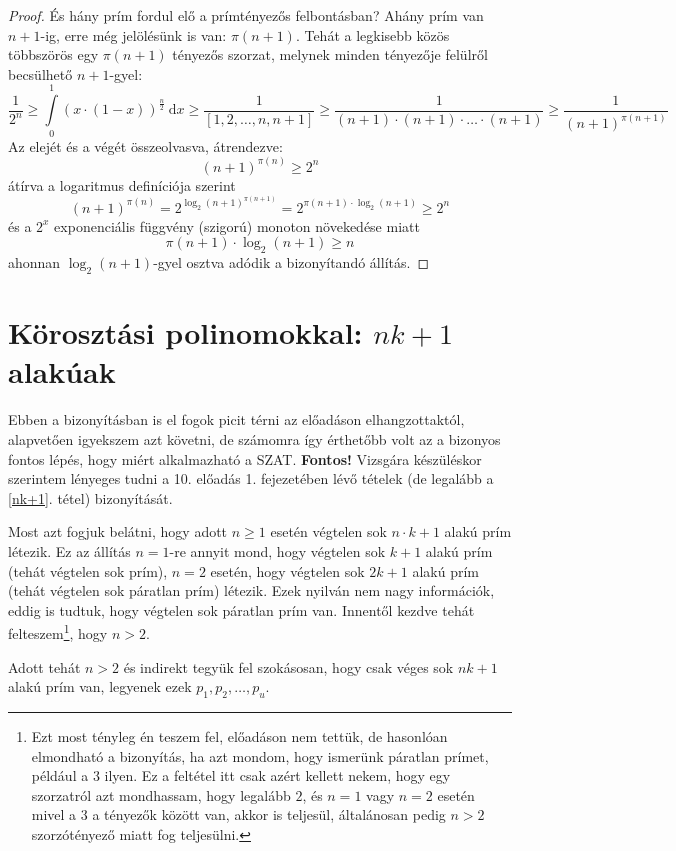 \documentclass[12pt]{book}
\theoremstyle{plain} %
\theoremstyle{definition} %
\theoremstyle{remark}
\numberwithin{equation}{section}  %
\begin{document}
\begin{proof}
		És hány prím fordul elő a prímtényezős felbontásban? Ahány prím van $n+1$-ig, erre még jelölésünk is van: $\pi(n+1)$. Tehát a legkisebb közös többszörös egy $\pi(n+1)$ tényezős szorzat, melynek minden tényezője felülről becsülhető $n+1$-gyel:
		\[ \dfrac{1}{2^n} \geq \int\limits_{0}^{1} (x\cdot (1-x))^\frac{n}{2}\ \mathrm{d}x \geq  \dfrac{1}{[1,2,\ldots, n, n+1]} \geq \dfrac{1}{(n+1) \cdot (n+1)\cdot \ldots \cdot (n+1)} \geq \dfrac{1}{(n+1)^{\pi(n+1)}}  \]
		Az elejét és a végét összeolvasva, átrendezve:
		\[ (n+1)^{\pi(n)} \geq 2^n  \]
		átírva a logaritmus definíciója szerint
		\[ (n+1)^{\pi(n)} = 2^{\log_2 (n+1)^{\pi(n+1)}} = 2^{\pi(n+1)\cdot \log_2 (n+1)} \geq 2^n  \]
		és a $2^x$ exponenciális függvény (szigorú) monoton növekedése miatt
		\[ \pi(n+1) \cdot \log_2 (n+1)  \geq n  \]
		ahonnan $\log_2 (n+1)$-gyel osztva adódik a bizonyítandó állítás.
	\end{proof}
	
	
	
	\section{ Körosztási polinomokkal: $nk+1$ alakúak}
	
	Ebben a bizonyításban is el fogok picit térni az előadáson elhangzottaktól, alapvetően igyekszem azt követni, de számomra így érthetőbb volt az a bizonyos fontos lépés, hogy miért alkalmazható a SZAT. \textbf{Fontos!} Vizsgára készüléskor szerintem lényeges tudni a 10. előadás 1. fejezetében lévő tételek (de legalább a \ref{nk+1}. tétel) bizonyítását.
	
	Most azt fogjuk belátni, hogy adott $n\geq 1$ esetén végtelen sok $n\cdot k + 1$ alakú prím létezik. Ez az állítás $n=1$-re annyit mond, hogy végtelen sok $k+1$ alakú prím (tehát végtelen sok prím), $n=2$ esetén, hogy végtelen sok $2k+1$ alakú prím (tehát végtelen sok páratlan prím) létezik. Ezek nyilván nem nagy információk, eddig is tudtuk, hogy végtelen sok páratlan prím van. Innentől kezdve tehát felteszem\footnote{Ezt most tényleg én teszem fel, előadáson nem tettük, de hasonlóan elmondható a bizonyítás, ha azt mondom, hogy ismerünk páratlan prímet, például a $3$ ilyen. Ez a feltétel itt csak azért kellett nekem, hogy egy szorzatról azt mondhassam, hogy legalább $2$, és $n=1$ vagy $n=2$ esetén mivel a $3$ a tényezők között van, akkor is teljesül, általánosan pedig $n > 2$ szorzótényező miatt fog teljesülni.}, hogy $n > 2$.
	
	Adott tehát $n > 2$ és indirekt tegyük fel szokásosan, hogy csak véges sok $nk+1$ alakú prím van, legyenek ezek $p_1, p_2, \ldots, p_u$.
	
\end{document}
